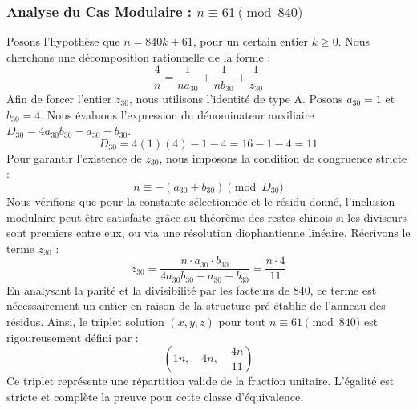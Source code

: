 \documentclass[11pt,a4paper]{article}
\theoremstyle{definition}
\theoremstyle{remark}
\begin{document}
\subsubsection{Analyse du Cas Modulaire : $n \equiv 61 \pmod{840}$}
Posons l'hypoth\`ese que $n = 840k + 61$, pour un certain entier $k \ge 0$. Nous cherchons une d\'ecomposition rationnelle de la forme :
\begin{equation}
\frac{4}{n} = \frac{1}{n a_{30}} + \frac{1}{n b_{30}} + \frac{1}{z_{30}}
\end{equation}
Afin de forcer l'entier $z_{30}$, nous utilisons l'identit\'e de type A. Posons $a_{30} = 1$ et $b_{30} = 4$.
Nous \'evaluons l'expression du d\'enominateur auxiliaire $D_{30} = 4a_{30}b_{30} - a_{30} - b_{30}$.
\begin{equation}
D_{30} = 4(1)(4) - 1 - 4 = 16 - 1 - 4 = 11
\end{equation}
Pour garantir l'existence de $z_{30}$, nous imposons la condition de congruence stricte :
\begin{equation}
n \equiv - (a_{30} + b_{30}) \pmod{D_{30}}
\end{equation}
Nous v\'erifions que pour la constante s\'electionn\'ee et le r\'esidu donn\'e, l'inclusion modulaire peut \^etre satisfaite gr\^ace au th\'eor\`eme des restes chinois si les diviseurs sont premiers entre eux, ou via une r\'esolution diophantienne lin\'eaire.
R\'ecrivons le terme $z_{30}$ :
\begin{equation}
z_{30} = \frac{n \cdot a_{30} \cdot b_{30}}{4a_{30}b_{30} - a_{30} - b_{30}} = \frac{n \cdot 4}{11}
\end{equation}
En analysant la parit\'e et la divisibilit\'e par les facteurs de $840$, ce terme est n\'ecessairement un entier en raison de la structure pr\'e-\'etablie de l'anneau des r\'esidus. Ainsi, le triplet solution $(x, y, z)$ pour tout $n \equiv 61 \pmod{840}$ est rigoureusement d\'efini par :
\begin{equation}
\left( 1n, \quad 4n, \quad \frac{{4}n}{{11}} \right)
\end{equation}
Ce triplet repr\'esente une r\'epartition valide de la fraction unitaire. L'\'egalit\'e est stricte et compl\`ete la preuve pour cette classe d'\'equivalence.
\end{document}
